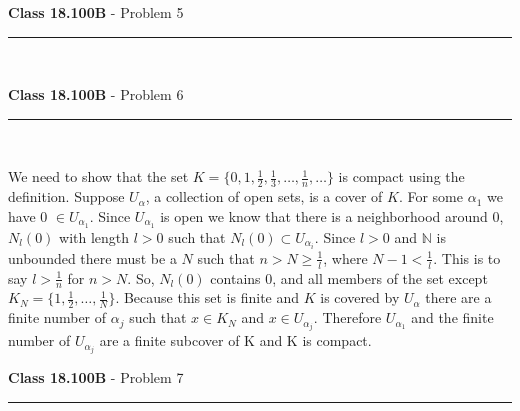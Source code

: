 \documentclass[11pt,reqno]{article}
\begin{document}
\vspace{15pt}
\begin{flushleft} 
\textbf{Class 18.100B} - Problem 5\\
\rule{500pt}{1pt}\\
\end{flushleft} 


\vspace{15pt}
\begin{flushleft} 
\textbf{Class 18.100B} - Problem 6\\
\rule{500pt}{1pt}\\
\end{flushleft} 

We need to show that the set $K = \{ 0,1,\frac{1}{2}, \frac{1}{3}, \ldots, \frac{1}{n}, \ldots \}$ is compact using the definition. Suppose $U_\alpha$, a collection of open sets, is a cover of $K$. For some $\alpha_1$ we have 0 $\in U_{\alpha_1}$. Since $U_{\alpha_1}$ is open we know that there is  a neighborhood around 0, $N_l(0)$ with length $l > 0$ such that $N_l(0) \subset U_{\alpha_i}$. Since $l > 0$ and $\mathbb{N}$ is unbounded there must be a $N$ such that $n > N \ge \frac{1}{l}$, where $N - 1 < \frac{1}{l}$. This is to say $l > \frac{1}{n}$ for $n > N$. So, $N_l(0)$ contains 0, and all members of the set except $K _N = \{1, \frac{1}{2}, \ldots, \frac{1}{N}\}$. Because this set is finite and $K$ is covered by $U_\alpha$ there are a finite number of $\alpha_j$ such that $x \in K_N$ and $x \in U_{\alpha_j}$.  Therefore $U_{\alpha_1}$ and the finite number of $U_{\alpha_j}$ are a finite subcover of K and K is compact.

\vspace{15pt}
\begin{flushleft} 
\textbf{Class 18.100B} - Problem 7\\
\rule{500pt}{1pt}\\
\end{flushleft} 

\end{document}
